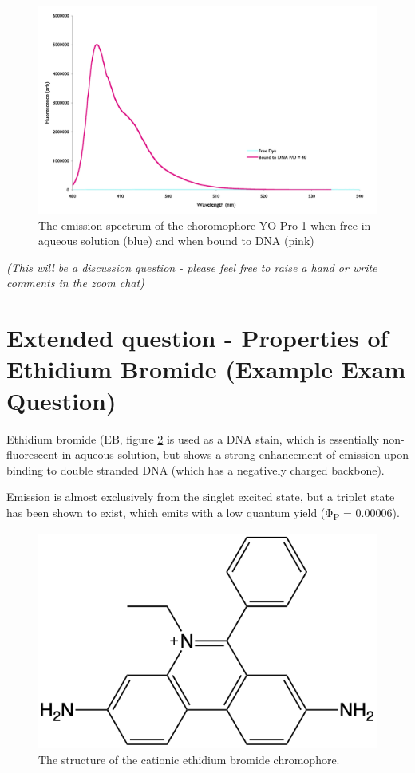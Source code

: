 \documentclass[
]{book}
\begin{document}
\begin{figure}

{\centering \includegraphics[width=0.7\linewidth]{images/YODNA} 

}

\caption{The emission spectrum of the choromophore YO-Pro-1 when free in aqueous solution (blue) and when bound to DNA (pink)}\label{fig:YODNA}
\end{figure}

\emph{(This will be a discussion question - please feel free to raise a hand or write comments in the zoom chat)}

\hypertarget{extended-question---properties-of-ethidium-bromide-example-exam-question}{%
\section{Extended question - Properties of Ethidium Bromide (Example Exam Question)}\label{extended-question---properties-of-ethidium-bromide-example-exam-question}}

Ethidium bromide (EB, figure \ref{fig:ethidiumstructure} is used as a DNA stain, which is essentially non-fluorescent in aqueous solution, but shows a strong enhancement of emission upon binding to double stranded DNA (which has a negatively charged backbone).

Emission is almost exclusively from the singlet excited state, but a triplet state has been shown to exist, which emits with a low quantum yield (Φ\textsubscript{P} = 0.00006).

\begin{figure}

{\centering \includegraphics[width=0.3\linewidth]{images/ethidiumstructure} 

}

\caption{The structure of the cationic ethidium bromide chromophore.}\label{fig:ethidiumstructure}
\end{figure}
\end{document}
